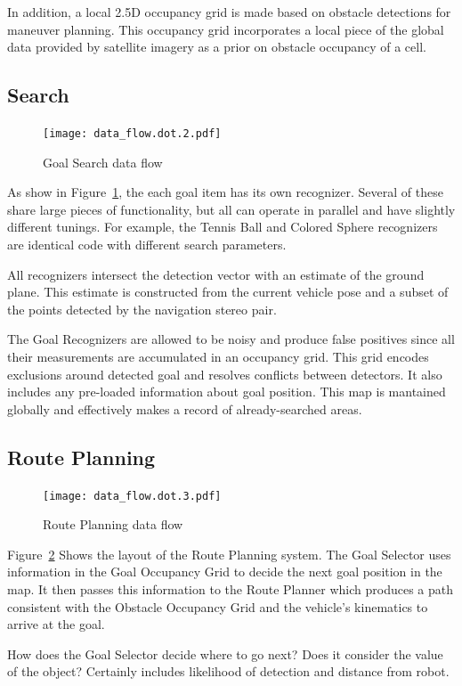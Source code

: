 \documentclass[12pt]{article}
\begin{document}
In addition, a local 2.5D occupancy grid is made based on obstacle detections for maneuver planning. This occupancy grid incorporates a local piece of the global data provided by satellite imagery as a prior on obstacle occupancy of a cell.

\subsection{Search}\label{Search}
\begin{figure}[htbp]
\centering
\texttt{[image: data\_flow.dot.2.pdf]}
\caption{Goal Search data flow}
\label{fig_df_gs}
\end{figure}
As show in Figure~\ref{fig_df_gs}, the each goal item has its own recognizer. Several of these share large pieces of functionality, but all can operate in parallel and have slightly different tunings. For example, the Tennis Ball and Colored Sphere recognizers are identical code with different search parameters.

All recognizers intersect the detection vector with an estimate of the ground plane. This estimate is constructed from the current vehicle pose and a subset of the points detected by the navigation stereo pair.

The Goal Recognizers are allowed to be noisy and produce false positives since all their measurements are accumulated in an occupancy grid. This grid encodes exclusions around detected goal and resolves conflicts between detectors. It also includes any pre-loaded information about goal position. This map is mantained globally and effectively makes a record of already-searched areas.

\subsection{Route Planning}
\begin{figure}[htbp]
\centering
\texttt{[image: data\_flow.dot.3.pdf]}
\caption{Route Planning data flow}
\label{fig_df_rp}
\end{figure}
Figure~\ref{fig_df_rp} Shows the layout of the Route Planning system. The Goal Selector uses information in the Goal Occupancy Grid to decide the next goal position in the map. It then passes this information to the Route Planner which produces a path consistent with the Obstacle Occupancy Grid and the vehicle's kinematics to arrive at the goal.

How does the Goal Selector decide where to go next? Does it consider the value of the object? Certainly includes likelihood of detection and distance from robot.
\end{document}
